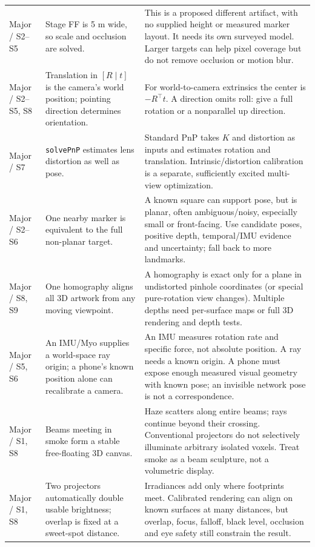 \documentclass[11pt,a4paper]{article}
\begin{document}
\begin{longtable}{@{}L{25mm}L{56mm}L{74mm}@{}}
Major / S2--S5 &
Stage FF is 5 m wide, so scale and occlusion are solved. &
This is a proposed different artifact, with no supplied height or measured
marker layout. It needs its own surveyed model. Larger targets can help
pixel coverage but do not remove occlusion or motion blur.\\
Major / S2--S5, S8 &
Translation in $[R\mid t]$ is the camera's world position; pointing
direction determines orientation. &
For world-to-camera extrinsics the center is $-R^\top t$.
A direction omits roll: give a full rotation or a nonparallel up direction.\\
Major / S7 &
\texttt{solvePnP} estimates lens distortion as well as pose. &
Standard PnP takes $K$ and distortion as inputs and estimates rotation and
translation. Intrinsic/distortion calibration is a separate, sufficiently
excited multi-view optimization.\\
Major / S2--S6 &
One nearby marker is equivalent to the full non-planar target. &
A known square can support pose, but is planar, often ambiguous/noisy,
especially small or front-facing. Use candidate poses, positive depth,
temporal/IMU evidence and uncertainty; fall back to more landmarks.\\
Major / S8, S9 &
One homography aligns all 3D artwork from any moving viewpoint. &
A homography is exact only for a plane in undistorted pinhole coordinates
(or special pure-rotation view changes). Multiple depths need per-surface
maps or full 3D rendering and depth tests.\\
Major / S5, S6 &
An IMU/Myo supplies a world-space ray origin; a phone's known position
alone can recalibrate a camera. &
An IMU measures rotation rate and specific force, not absolute position.
A ray needs a known origin. A phone must expose enough measured visual
geometry with known pose; an invisible network pose is not a correspondence.\\
Major / S1, S8 &
Beams meeting in smoke form a stable free-floating 3D canvas. &
Haze scatters along entire beams; rays continue beyond their crossing.
Conventional projectors do not selectively illuminate arbitrary isolated
voxels. Treat smoke as a beam sculpture, not a volumetric display.\\
Major / S1, S8 &
Two projectors automatically double usable brightness; overlap is fixed
at a sweet-spot distance. &
Irradiances add only where footprints meet. Calibrated rendering can align
on known surfaces at many distances, but overlap, focus, falloff, black
level, occlusion and eye safety still constrain the result.\\

\end{longtable}
\end{document}
